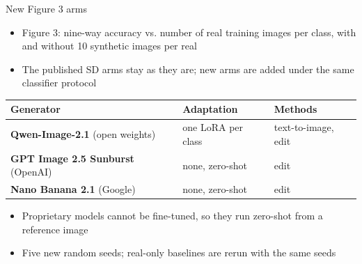 \documentclass[aspectratio=169,11pt]{beamer}
\begin{document}
\begin{frame}{New Figure 3 arms}
  \begin{itemize}
    \item Figure 3: nine-way accuracy vs. number of real training images per class, with and without 10 synthetic images per real
    \item The published SD arms stay as they are; new arms are added under the same classifier protocol
  \end{itemize}
  \vspace{0.6em}
  \begin{center}
  \begin{tabular}{lll}
    \toprule
    Generator & Adaptation & Methods \\
    \midrule
    \textbf{Qwen-Image-2.1} (open weights) & one LoRA per class & text-to-image, edit \\
    \textbf{GPT Image 2.5 Sunburst} (OpenAI) & none, zero-shot & edit \\
    \textbf{Nano Banana 2.1} (Google) & none, zero-shot & edit \\
    \bottomrule
  \end{tabular}
  \end{center}
  \vspace{0.6em}
  \begin{itemize}
    \item Proprietary models cannot be fine-tuned, so they run zero-shot from a reference image
    \item Five new random seeds; real-only baselines are rerun with the same seeds
  \end{itemize}
\end{frame}
\end{document}
